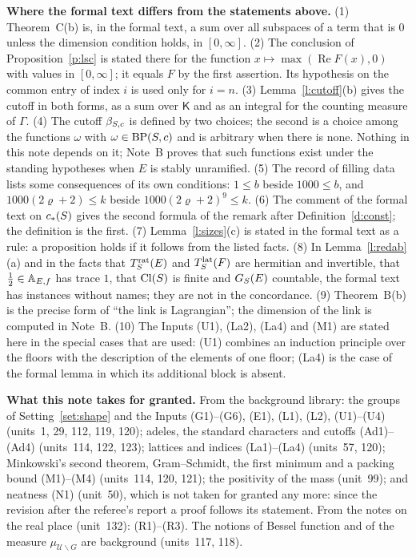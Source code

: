 \documentclass[11pt,a4paper]{article}
\newcommand{\subhead}[1]{\par\addvspace{9pt plus 2pt}\Needspace{4\baselineskip}\noindent\textbf{#1}\enspace\ignorespaces}
\theoremstyle{plainx}
\theoremstyle{uprightx}
\begin{document}
\subhead{Where the formal text differs from the statements above.}
(1) Theorem~C(b) is, in the formal text, a sum over all subspaces of a term that is $0$ unless the dimension
condition holds, in $[0,\infty]$. (2) The conclusion of Proposition~\ref{p:lsc} is stated there for the function
$x\mapsto\max(\operatorname{Re} F(x),0)$ with values in $[0,\infty]$; it equals $F$ by the first assertion. Its hypothesis on the
common entry of index $i$ is used only for $i=n$. (3) Lemma~\ref{l:cutoff}(b) gives the cutoff in both forms, as a
sum over $\mathsf{K}$ and as an integral for the counting measure of $\Gamma$. (4) The cutoff $\beta_{S,c}$ is defined by two
choices; the second is a choice among the functions $\omega$ with $\omega\in\operatorname{BP}(S,c)$ and is arbitrary when there is
none. Nothing in this note depends on it; Note~B proves that such functions exist under the standing hypotheses when $E$ is stably unramified.
(5) The record of filling data lists some consequences of its own conditions: $1\le b$ beside $1000\le b$, and
$1000(2\varrho+2)\le k$ beside $1000(2\varrho+2)^9\le k$. (6) The comment of the formal text on $c_{*}(S)$ gives the
second formula of the remark after Definition~\ref{d:const}; the definition is the first. (7) Lemma~\ref{l:sizes}(c)
is stated in the formal text as a rule: a proposition holds if it follows from the listed facts. (8) In
Lemma~\ref{l:redab}(a) and in the facts that $T^{\mathrm{rat}}_{S}(E)$ and $T^{\mathrm{lat}}_{S}(F)$ are hermitian and invertible, that
$\tfrac12\in\mathbb{A}_{E,f}$ has trace $1$, that $\mathrm{Cl}(S)$ is finite and $G_{S}(E)$ countable, the formal text has instances
without names; they are not in the concordance. (9) Theorem~B(b) is the precise form of ``the link is Lagrangian'';
the dimension of the link is computed in Note~B. (10) The Inputs (U1), (La2), (La4) and (M1) are stated here in the
special cases that are used: (U1) combines an induction principle over the floors with the description of the
elements of one floor; (La4) is the case of the formal lemma in which its additional block is absent.

\subhead{What this note takes for granted.} From the background library: the groups of
Setting~\ref{set:shape} and the Inputs (G1)--(G6), (E1), (L1), (L2), (U1)--(U4) (units~1, 29, 112, 119, 120);
adeles, the standard characters and cutoffs (Ad1)--(Ad4) (units~114, 122, 123); lattices and indices
(La1)--(La4) (units~57, 120); Minkowski's second theorem, Gram--Schmidt, the first minimum and a packing bound
(M1)--(M4) (units~114, 120, 121); the positivity of the mass (unit~99); and neatness (N1) (unit~50), which is not taken for granted any more: since the revision after the referee's report a proof follows its statement. From the notes on
the real place (unit~132): (R1)--(R3). The notions of Bessel function and of the measure
$\mu_{\mathcal U\backslash G}$ are background (units~117, 118).
\end{document}
